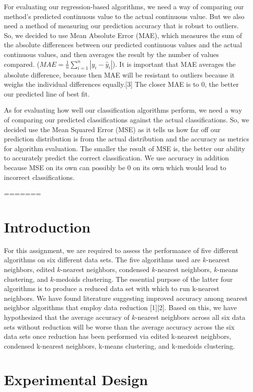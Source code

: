 \documentclass{article}
\begin{document}
For evaluating our regression-based algorithms, we need a way of comparing our method's predicted continuous value to the actual continuous value. But we also need a method of measuring our prediction accuracy that is robust to outliers. So, we decided to use Mean Absolute Error (MAE), which measures the sum of the absolute differences between our predicted continuous values and the actual continuous values, and then averages the result by the number of values compared. ($MAE = \frac{1}{n} \sum_{i=1}^n | y_i - \hat{y}_i|$). It is important that MAE averages the absolute difference, because then MAE will be resistant to outliers because it weighs the individual differences equally.[3] The closer MAE is to 0, the better our predicted line of best fit.

As for evaluating how well our classification algorithms perform, we need a way of comparing our predicted classifications against the actual classifications. So, we decided use the Mean Squared Error (MSE) as it tells us how far off our prediction distribution is from the actual distribution and the accuracy as metrics for algorithm evaluation. The smaller the result of MSE is, the better our ability to accurately predict the correct classification.  We use accuracy in addition because MSE on its own can possibly be 0 on its own which would lead to incorrect classifications.

=======
\section{Introduction}
For this assignment, we are required to assess the performance of five different algorithms on six different data sets. The five algorithms used are $k$-nearest neighbors, edited $k$-nearest neighbors, condensed $k$-nearest neighbors, $k$-means clustering, and $k$-medoids clustering.  The essential purpose of the latter four algorithms is to produce a reduced data set with which to run k-nearest neighbors. We have found literature suggesting improved accuracy among nearest neighbor algorithms that employ data reduction [1][2].  Based on this, we have hypothesized that the average accuracy of $k$-nearest neighbors across all six data sets without reduction will be worse than the average accuracy across the six data sets once reduction has been performed via edited k-nearest neighbors, condensed k-nearest neighbors, k-means clustering, and k-medoids clustering.
\section{Experimental Design}
\end{document}
